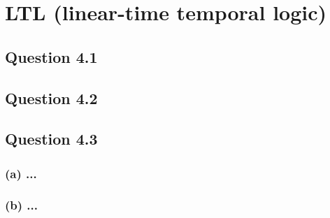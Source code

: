 \section{LTL (linear-time temporal logic)}
\subsection*{Question 4.1}
\subsection*{Question 4.2}
\subsection*{Question 4.3}
\subsubsection*{(a) \mdseries ...}
\subsubsection*{(b) \mdseries ...}